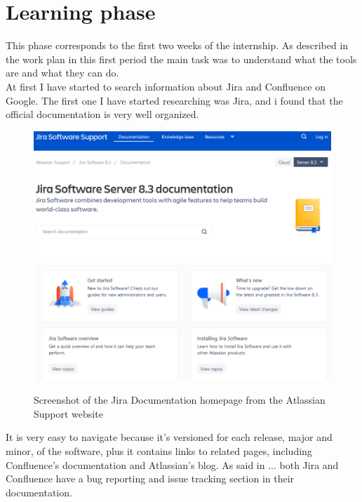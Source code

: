 	\newpage

\section{Learning phase}
	This phase corresponds to the first two weeks of the internship.
	As described in the work plan in this first period the main task was to understand what the tools are and what they can do.\\
	At first I have started to search information about Jira and Confluence on Google.
	The first one I have started researching was Jira, and i found that the official documentation is very well organized.
	\begin{figure}[H]
		\centering
		\includegraphics[width=1\textwidth]{resources/jira_documentation}\\
		\caption{Screenshot of the Jira Documentation homepage from the Atlassian Support website}
	\end{figure}
	It is very easy to navigate because it's versioned for each release, major and minor, of the software, plus it contains links to related pages, including Confluence's documentation and Atlassian's blog.
	As said in ... both Jira and Confluence have a bug reporting and issue tracking section in their documentation.

